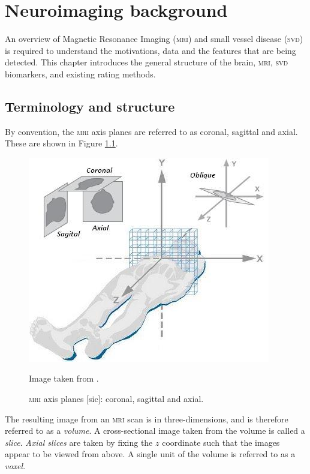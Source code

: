 %
%



\chapter{Neuroimaging background}\label{mri_svd_intro}

An overview of Magnetic Resonance Imaging (\textsc{mri}) and small vessel disease (\textsc{svd}) is required to understand the motivations, data and the features that are being detected. This chapter introduces the general structure of the brain, \textsc{mri}, \textsc{svd} biomarkers, and existing rating methods.

\section{Terminology and structure}

By convention, the \textsc{mri} axis planes are referred to as coronal, sagittal and axial. These are shown in Figure \ref{svd-axes}.

\begin{figure}[ht]
	\centering
	\includegraphics[scale=0.8]{Images/2_axes2.jpg}
	\caption{\textsc{mri} axis planes [sic]: coronal, sagittal and axial.}
	\small Image taken from \cite{Bean2014}.
	\label{svd-axes}
\end{figure}

The resulting image from an \textsc{mri} scan is in three-dimensions, and is therefore referred to as a \textit{volume}. A cross-sectional image taken from the volume is called a \textit{slice}. \textit{Axial slices} are taken by fixing the $z$ coordinate such that the images appear to be viewed from above. A single unit of the volume is referred to as a \textit{voxel}.

